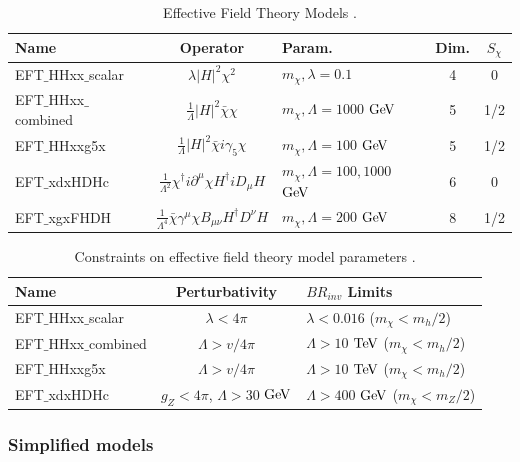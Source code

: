 \begin{table}[htbH]
\begin{center}
\begin{tabular}{ l | c | l | c | c}
\hline
Name & Operator & Param. & Dim. & $S_{\chi}$ \\
\hline
EFT$\_$HHxx$\_$scalar & $\lambda |H|^{2} \chi^{2}$ & $m_{\chi}, \lambda = 0.1$ & 4 & 0 \\
EFT$\_$HHxx$\_$combined & $\frac{1}{\Lambda} |H|^{2} \bar{\chi} \chi$ & $m_{\chi}, \Lambda = 1000$ $\mathrm{Ge\kern -0.1em V}$ & 5 & 1/2 \\
EFT$\_$HHxxg5x & $\frac{1}{\Lambda} |H|^{2} \bar{\chi} i \gamma_{5} \chi$ & $m_{\chi}, \Lambda = 100$ $\mathrm{Ge\kern -0.1em V}$ & 5 & 1/2\\
EFT$\_$xdxHDHc & $\frac{1}{\Lambda^{2}} \chi^{\dag} i \partial^{\mu} \chi H^{\dag} i D_{\mu} H $ & $m_{\chi}, \Lambda = 100,1000$ $\mathrm{Ge\kern -0.1em V}$ & 6 & 0\\
EFT$\_$xgxFHDH & $\frac{1}{\Lambda^{4}} \bar{\chi} \gamma^{\mu} \chi B_{\mu\nu} H^{\dag} D^{\nu} H$ & $m_{\chi}, \Lambda = 200$ $\mathrm{Ge\kern -0.1em V}$ & 8 & 1/2\\
\hline
\end{tabular}
\caption{Effective Field Theory Models \cite{Carpenter:2013xra}.}\label{tab:efts}
\end{center}
\end{table}

\begin{table}[htbH]
\begin{center}
\begin{tabular}{ l | c | l}
\hline
Name & Perturbativity & $BR_{inv}$ Limits \\
\hline
EFT$\_$HHxx$\_$scalar & $\lambda < 4\pi$ & $\lambda < 0.016$ ($m_\chi < m_h/2$)\\
EFT$\_$HHxx$\_$combined & $\Lambda > v/4\pi $ & $\Lambda > 10$ $\mathrm{Te\kern -0.1em V}$ ($m_\chi < m_h/2$)\\
EFT$\_$HHxxg5x & $\Lambda > v/4\pi $ & $\Lambda > 10$ $\mathrm{Te\kern -0.1em V}$ ($m_\chi < m_h/2$) \\
EFT$\_$xdxHDHc & $g_Z < 4\pi$, $\Lambda > 30$ $\mathrm{Ge\kern -0.1em V}$ & $\Lambda > 400$ $\mathrm{Ge\kern -0.1em V}$ ($m_\chi < m_Z/2$) \\
\hline
\end{tabular}
\caption{Constraints on effective field theory model parameters \cite{Carpenter:2013xra}.}\label{tab:eftlims}
\end{center}
\end{table}

\subsubsection{Simplified models}


